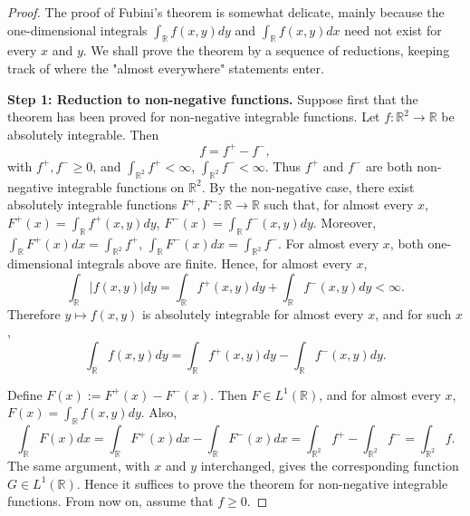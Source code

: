 \begin{proof}
The proof of Fubini's theorem is somewhat delicate, mainly because the one-dimensional integrals $\int_{\mathbb{R}}f(x,y)dy$ and $\int_{\mathbb{R}}f(x,y)dx$ need not exist for every $x$ and $y$. We shall prove the theorem by a sequence of reductions, keeping track of where the "almost everywhere" statements enter.

\textbf{Step 1: Reduction to non-negative functions.}
Suppose first that the theorem has been proved for non-negative integrable functions. Let $f:\mathbb{R}^{2}\rightarrow\mathbb{R}$ be absolutely integrable. Then
\[
    f=f^{+}-f^{-},
\]
with $f^{+}, f^{-}\ge0$, and $\int_{\mathbb{R}^{2}}f^{+}<\infty$, $\int_{\mathbb{R}^{2}}f^{-}<\infty$. Thus $f^{+}$ and $f^{-}$ are both non-negative integrable functions on $\mathbb{R}^{2}$. By the non-negative case, there exist absolutely integrable functions $F^{+}, F^{-}:\mathbb{R}\rightarrow\mathbb{R}$ such that, for almost every $x$, $F^{+}(x)=\int_{\mathbb{R}}f^{+}(x,y)dy$, $F^{-}(x)=\int_{\mathbb{R}}f^{-}(x,y)dy$. Moreover, $\int_{\mathbb{R}}F^{+}(x)dx=\int_{\mathbb{R}^{2}}f^{+}$, $\int_{\mathbb{R}}F^{-}(x)dx=\int_{\mathbb{R}^{2}}f^{-}$. For almost every $x$, both one-dimensional integrals above are finite. Hence, for almost every $x$,
\[
    \int_{\mathbb{R}}|f(x,y)|dy=\int_{\mathbb{R}}f^{+}(x,y)dy+\int_{\mathbb{R}}f^{-}(x,y)dy<\infty.
\]
Therefore $y\mapsto f(x,y)$ is absolutely integrable for almost every $x$, and for such $x$,
\[
    \int_{\mathbb{R}}f(x,y)dy=\int_{\mathbb{R}}f^{+}(x,y)dy-\int_{\mathbb{R}}f^{-}(x,y)dy.
\]

Define $F(x):=F^{+}(x)-F^{-}(x)$. Then $F\in L^{1}(\mathbb{R})$, and for almost every $x$, $F(x)=\int_{\mathbb{R}}f(x,y)dy$. Also,
\[
    \int_{\mathbb{R}}F(x)dx=\int_{\mathbb{R}}F^{+}(x)dx-\int_{\mathbb{R}}F^{-}(x)dx=\int_{\mathbb{R}^{2}}f^{+}-\int_{\mathbb{R}^{2}}f^{-}=\int_{\mathbb{R}^{2}}f.
\]
The same argument, with $x$ and $y$ interchanged, gives the corresponding function $G\in L^{1}(\mathbb{R})$. Hence it suffices to prove the theorem for non-negative integrable functions. From now on, assume that $f\ge0$.


\end{proof}

